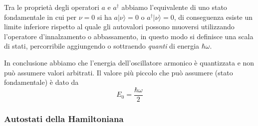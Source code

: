 Tra le propriet\`a degli operatori $a$ e $a^\dag$ abbiamo l'equivalente di uno stato fondamentale in cui per $\nu = 0$ si ha $a|\nu \rangle =0$ o $a^\dag |\nu \rangle = 0 $, di conseguenza esiste un limite inferiore rispetto al quale gli autovalori possono muoversi utilizzando l'operatore d'innalzamento o abbassamento, in questo modo si definisce una scala di stati, percorribile aggiungendo o sottraendo \textit{quanti} di energia $\hbar \omega$.

\vspace{1cm}
\vspace{1cm}

\noindent In conclusione abbiamo che l'energia dell'oscillatore armonico \`e quantizzata e non pu\`o assumere valori arbitrati. Il valore pi\`u piccolo che pu\`o assumere (stato fondamentale) \`e dato da 
\begin{equation*}
	E_0 = \frac{\hbar \omega}{2}
\end{equation*}

\subsubsection{Autostati della Hamiltoniana }

